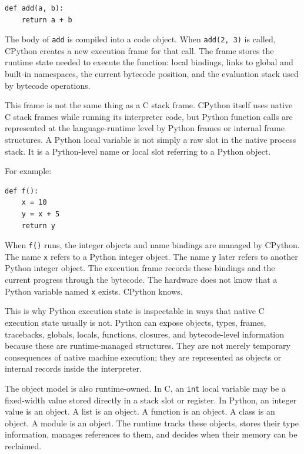 \documentclass[a4paper,twoside]{report}
\begin{document}
\begin{verbatim}
def add(a, b):
    return a + b
\end{verbatim}

The body of \texttt{add} is compiled into a code object. When \texttt{add(2, 3)} is called, CPython creates a new execution frame for that call. The frame stores the runtime state needed to execute the function: local bindings, links to global and built-in namespaces, the current bytecode position, and the evaluation stack used by bytecode operations.

This frame is not the same thing as a C stack frame. CPython itself uses native C stack frames while running its interpreter code, but Python function calls are represented at the language-runtime level by Python frames or internal frame structures. A Python local variable is not simply a raw slot in the native process stack. It is a Python-level name or local slot referring to a Python object.

For example:

\begin{verbatim}
def f():
    x = 10
    y = x + 5
    return y
\end{verbatim}

When \texttt{f()} runs, the integer objects and name bindings are managed by CPython. The name \texttt{x} refers to a Python integer object. The name \texttt{y} later refers to another Python integer object. The execution frame records these bindings and the current progress through the bytecode. The hardware does not know that a Python variable named \texttt{x} exists. CPython knows.

This is why Python execution state is inspectable in ways that native C execution state usually is not. Python can expose objects, types, frames, tracebacks, globals, locals, functions, closures, and bytecode-level information because these are runtime-managed structures. They are not merely temporary consequences of native machine execution; they are represented as objects or internal records inside the interpreter.

The object model is also runtime-owned. In C, an \texttt{int} local variable may be a fixed-width value stored directly in a stack slot or register. In Python, an integer value is an object. A list is an object. A function is an object. A class is an object. A module is an object. The runtime tracks these objects, stores their type information, manages references to them, and decides when their memory can be reclaimed.
\end{document}
